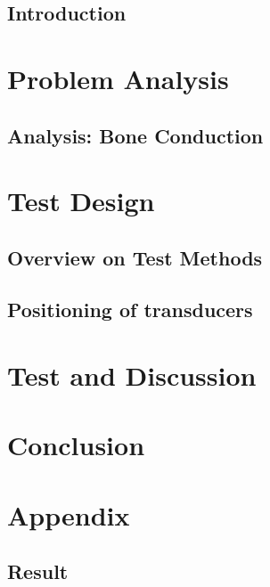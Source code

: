 \glsresetall
 \graphicspath{{figures/analysing/}}
\chapter{Introduction}\label{ch:intro}



\part{Problem Analysis}\label{pt:analysis} \glsresetall
\graphicspath{{figures/analysis/}}
\chapter{Analysis: Bone Conduction}\label{ch:bone_conductors}







\part{Test Design}\label{pt:design} 
\graphicspath{{figures/design/}}	
\chapter{Overview on Test Methods}\label{ch:test_methopd}

\chapter{Positioning of transducers}\label{ch:optimization}




\part{Test and Discussion}\label{pt:test}
\graphicspath{{figures/tests/}}


 
\part{Conclusion}\label{pt:conclusion}



\glsresetall
\appendix %

 \graphicspath{{figures/appendix/}}
\part{Appendix}\label{pt:appendix}

%
\chapter{Result}
